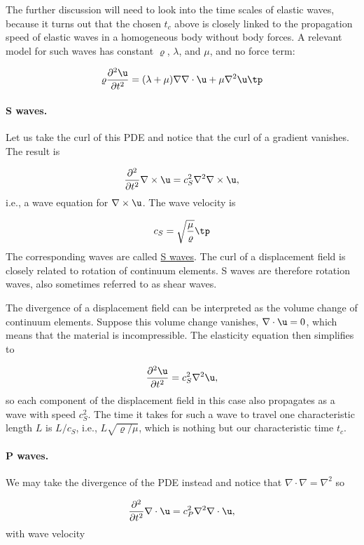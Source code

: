 \documentclass[graybox,envcountchap,sectrefs,final]{svmonodo}
\begin{document}
The further discussion will need to look into the time scales of
elastic waves, because it turns out that the chosen $t_c$ above is
closely linked to the propagation speed of elastic waves in a
homogeneous body without body forces.  A relevant model for
such waves has constant
$\varrho$, $\lambda$, and $\mu$, and no force term:

\begin{equation}
\varrho\frac{\partial^2\u}{\partial t^2} =
(\lambda + \mu)\nabla \nabla\cdot\u + \mu\nabla^2\u\tp
\label{scale:elasticity:waves:eq}
\end{equation}

\paragraph{S waves.}
Let us take the curl of this PDE and notice
that the curl of a  gradient vanishes. The result is

\[\frac{\partial^2}{\partial t^2}\nabla\times\u = c_S^2\nabla^2\nabla\times\u,\]
i.e., a wave equation for $\nabla\times\u$. The wave velocity is

\[ c_S = \sqrt{\frac{\mu}{\varrho}}\tp\]
The corresponding waves are called
\href{{https://en.wikipedia.org/wiki/S-wave}}{S waves}. The curl of a
displacement field is closely related to rotation of continuum elements.
S waves are therefore rotation waves, also sometimes referred to as
shear waves.

The divergence of a displacement field can be interpreted as the
volume change of continuum elements. Suppose this volume change vanishes,
$\nabla\cdot\u = 0$, which means that the material is incompressible.
The elasticity equation then simplifies to

\[\frac{\partial^2 \u}{\partial t^2} = c_S^2\nabla^2\u,\]
so each component of
the displacement field in this case also propagates as a wave
with speed $c_S^2$.
The time it takes for such a wave to travel one characteristic length
$L$ is $L/c_S$, i.e., $L\sqrt{\varrho/\mu}$, which is nothing but
our characteristic time $t_c$.

\paragraph{P waves.}
We may take the divergence of the PDE instead and notice that $\nabla\cdot\nabla
=\nabla^2$ so

\[\frac{\partial^2}{\partial t^2}\nabla\cdot\u = c_P^2\nabla^2\nabla\cdot\u,\]
with wave velocity
\end{document}
